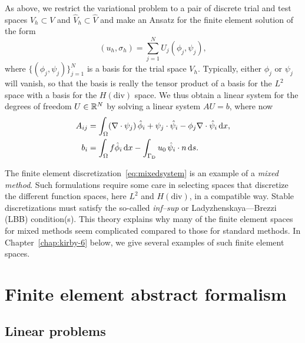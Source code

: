 As above, we restrict the variational problem to a pair of discrete
trial and test spaces $V_h \subset V$ and $\hat{V}_h \subset \hat{V}$
and make an Ansatz for the finite element solution of the form
\begin{equation}
  (u_h, \sigma_h) = \sum_{j=1}^N U_j (\phi_j, \psi_j),
\end{equation}
where $\{(\phi_j, \psi_j)\}_{j=1}^N$ is a basis for the trial space
$V_h$. Typically, either \( \phi_j \) or \( \psi_j \) will vanish, so
that the basis is really the tensor product of a basis for the \( L^2
\) space with a basis for the \( H(\mathrm{div}) \) space. We thus
obtain a linear system for the degrees of freedom $U \in \mathbb{R}^N$ by
solving a linear system $A U = b$, where now
\begin{equation} \label{eq:mixedsystem}
  \begin{split}
    A_{ij} &=
    \int_{\Omega} (\nabla \cdot \psi_j) \, \hat{\phi}_i
    + \psi_j \cdot \hat{\psi}_i
    - \phi_j \nabla \cdot \hat{\psi}_i \, \mathrm{d}x,
    \\
    b_i &=
    \int_{\Omega} f \hat{\phi}_i \, \mathrm{d}x
    - \int_{\Gamma_{\mathrm{D}}} u_0 \, \hat{\psi}_i \cdot n \, \mathrm{d}s.
  \end{split}
\end{equation}

The finite element discretization~\eqref{eq:mixedsystem} is an example
of a \emph{mixed method}. Such formulations require some care in
selecting spaces that discretize the different function spaces, here
$L^2$ and $H(\mathrm{div})$, in a compatible way.  Stable
discretizations must satisfy the so-called \emph{inf--sup} or
Ladyzhenskaya--\babuska{}--Brezzi (LBB) condition(s). This theory
explains why many of the finite element spaces for mixed methods seem
complicated compared to those for standard methods. In
Chapter~\ref{chap:kirby-6} below, we give several examples of such
finite element spaces.

\section{Finite element abstract formalism}
\label{sec:abstract}

\subsection{Linear problems}
\label{sec:abstract,linear}

